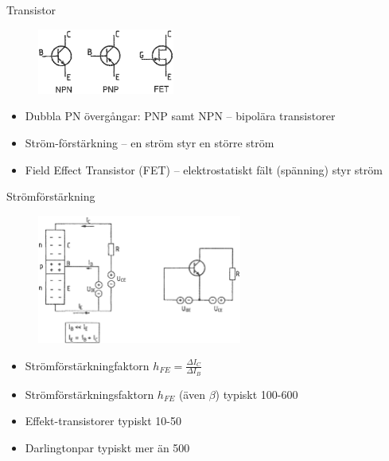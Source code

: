 \documentclass{beamer}
\begin{document}
\begin{frame}{Transistor}

\begin{figure}[h]
\includegraphics[width=0.4\textwidth]{images/cropped_pdfs/bild_2_2-16.pdf}
\end{figure}

\begin{itemize}
  \item Dubbla PN övergångar: PNP samt NPN -- bipolära transistorer
  \item Ström-förstärkning -- en ström styr en större ström
  \item Field Effect Transistor (FET) -- elektrostatiskt fält (spänning) styr ström
\end{itemize}
\end{frame}

\begin{frame}{Strömförstärkning}

\begin{figure}[h]
\includegraphics[width=0.6\textwidth]{images/cropped_pdfs/bild_2_2-18.pdf}
\end{figure}

\begin{itemize}
    \item Strömförstärkningfaktorn $h_{FE}=\frac{\Delta I_C}{\Delta I_B}$
    \item Strömförstärkningsfaktorn $h_{FE}$ (även $\beta$) typiskt 100-600
    \item Effekt-transistorer typiskt 10-50
    \item Darlingtonpar typiskt mer än 500
  \end{itemize}
\end{frame}
\end{document}

